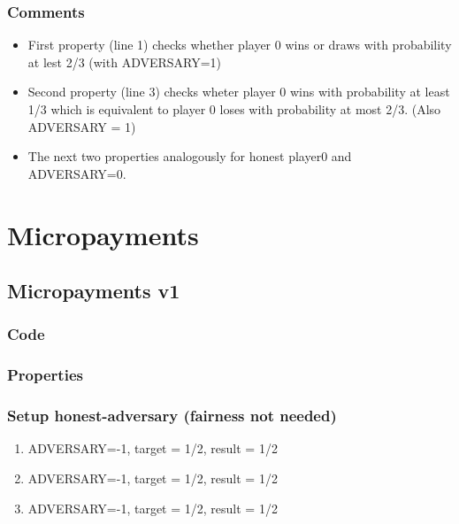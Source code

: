 \documentclass{article}
\begin{document}
\subsubsection{Comments}

\begin{itemize}
\item First property (line 1) checks whether player 0 wins or draws with probability at lest 2/3 (with ADVERSARY=1)
\item Second property (line 3) checks wheter player 0 wins with probability at least 1/3 which is equivalent to player 0
loses with probability at most 2/3. (Also ADVERSARY = 1)
\item The next two properties analogously for honest player0 and ADVERSARY=0.
\end{itemize}


\section{Micropayments}

\subsection{Micropayments v1}

\subsubsection{Code}



\subsubsection{Properties}



\subsubsection{Setup honest-adversary (fairness not needed)}

\begin{enumerate}
\item ADVERSARY=-1, target = 1/2, result = 1/2
\item ADVERSARY=-1, target = 1/2, result = 1/2
\item ADVERSARY=-1, target = 1/2, result = 1/2
\end{enumerate}
\end{document}
